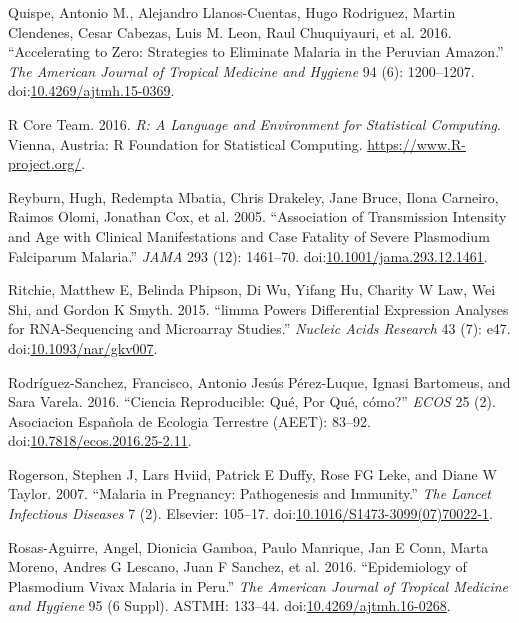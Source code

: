 \documentclass[a4paper]{article}
\begin{document}
\hypertarget{ref-accelerate2016}{}
Quispe, Antonio M., Alejandro Llanos-Cuentas, Hugo Rodriguez, Martin
Clendenes, Cesar Cabezas, Luis M. Leon, Raul Chuquiyauri, et al. 2016.
``Accelerating to Zero: Strategies to Eliminate Malaria in the Peruvian
Amazon.'' \emph{The American Journal of Tropical Medicine and Hygiene}
94 (6): 1200--1207.
doi:\href{https://doi.org/10.4269/ajtmh.15-0369}{10.4269/ajtmh.15-0369}.

\hypertarget{ref-R2016}{}
R Core Team. 2016. \emph{R: A Language and Environment for Statistical
Computing}. Vienna, Austria: R Foundation for Statistical Computing.
\url{https://www.R-project.org/}.

\hypertarget{ref-reyburn2015}{}
Reyburn, Hugh, Redempta Mbatia, Chris Drakeley, Jane Bruce, Ilona
Carneiro, Raimos Olomi, Jonathan Cox, et al. 2005. ``Association of
Transmission Intensity and Age with Clinical Manifestations and Case
Fatality of Severe Plasmodium Falciparum Malaria.'' \emph{JAMA} 293
(12): 1461--70.
doi:\href{https://doi.org/10.1001/jama.293.12.1461}{10.1001/jama.293.12.1461}.

\hypertarget{ref-limma}{}
Ritchie, Matthew E, Belinda Phipson, Di Wu, Yifang Hu, Charity W Law,
Wei Shi, and Gordon K Smyth. 2015. ``limma Powers Differential
Expression Analyses for RNA-Sequencing and Microarray Studies.''
\emph{Nucleic Acids Research} 43 (7): e47.
doi:\href{https://doi.org/10.1093/nar/gkv007}{10.1093/nar/gkv007}.

\hypertarget{ref-CienciaReproducible2016}{}
Rodríguez-Sanchez, Francisco, Antonio Jesús Pérez-Luque, Ignasi
Bartomeus, and Sara Varela. 2016. ``Ciencia Reproducible: Qué, Por Qué,
cómo?'' \emph{ECOS} 25 (2). Asociacion Española de Ecologia Terrestre
(AEET): 83--92.
doi:\href{https://doi.org/10.7818/ecos.2016.25-2.11}{10.7818/ecos.2016.25-2.11}.

\hypertarget{ref-rogerson2007preg}{}
Rogerson, Stephen J, Lars Hviid, Patrick E Duffy, Rose FG Leke, and
Diane W Taylor. 2007. ``Malaria in Pregnancy: Pathogenesis and
Immunity.'' \emph{The Lancet Infectious Diseases} 7 (2). Elsevier:
105--17.
doi:\href{https://doi.org/10.1016/S1473-3099(07)70022-1}{10.1016/S1473-3099(07)70022-1}.

\hypertarget{ref-rosas2016peru}{}
Rosas-Aguirre, Angel, Dionicia Gamboa, Paulo Manrique, Jan E Conn, Marta
Moreno, Andres G Lescano, Juan F Sanchez, et al. 2016. ``Epidemiology of
Plasmodium Vivax Malaria in Peru.'' \emph{The American Journal of
Tropical Medicine and Hygiene} 95 (6 Suppl). ASTMH: 133--44.
doi:\href{https://doi.org/10.4269/ajtmh.16-0268}{10.4269/ajtmh.16-0268}.
\end{document}
